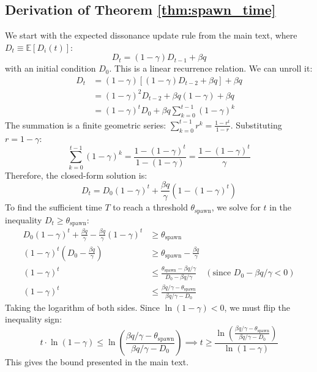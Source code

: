 \documentclass{article}
\begin{document}
\newpage
\begin{appendices}

\section{Derivation of Theorem \ref{thm:spawn_time}}
We start with the expected dissonance update rule from the main text, where $D_t \equiv \mathbb{E}[D_i(t)]$:
\begin{equation}
D_t = (1-\gamma)D_{t-1} + \beta q
\end{equation}
with an initial condition $D_0$. This is a linear recurrence relation. We can unroll it:
\begin{align*}
D_t &= (1-\gamma) \left[ (1-\gamma)D_{t-2} + \beta q \right] + \beta q \\
    &= (1-\gamma)^2 D_{t-2} + \beta q (1-\gamma) + \beta q \\
    &= (1-\gamma)^t D_0 + \beta q \sum_{k=0}^{t-1} (1-\gamma)^k
\end{align*}
The summation is a finite geometric series: $\sum_{k=0}^{t-1} r^k = \frac{1-r^t}{1-r}$. Substituting $r = 1-\gamma$:
\begin{equation}
\sum_{k=0}^{t-1} (1-\gamma)^k = \frac{1 - (1-\gamma)^t}{1 - (1-\gamma)} = \frac{1 - (1-\gamma)^t}{\gamma}
\end{equation}
Therefore, the closed-form solution is:
\begin{equation}
D_t = D_0(1-\gamma)^t + \frac{\beta q}{\gamma} \left(1-(1-\gamma)^t\right)
\end{equation}
To find the sufficient time $T$ to reach a threshold $\theta_{\text{spawn}}$, we solve for $t$ in the inequality $D_t \ge \theta_{\text{spawn}}$:
\begin{align*}
D_0(1-\gamma)^t + \frac{\beta q}{\gamma} - \frac{\beta q}{\gamma}(1-\gamma)^t &\ge \theta_{\text{spawn}} \\
(1-\gamma)^t \left(D_0 - \frac{\beta q}{\gamma}\right) &\ge \theta_{\text{spawn}} - \frac{\beta q}{\gamma} \\
(1-\gamma)^t &\le \frac{\theta_{\text{spawn}} - \beta q/\gamma}{D_0 - \beta q/\gamma} \quad (\text{since } D_0 - \beta q/\gamma < 0) \\
(1-\gamma)^t &\le \frac{\beta q/\gamma - \theta_{\text{spawn}}}{\beta q/\gamma - D_0}
\end{align*}
Taking the logarithm of both sides. Since $\ln(1-\gamma) < 0$, we must flip the inequality sign:
\begin{equation*}
t \cdot \ln(1-\gamma) \le \ln\left(\frac{\beta q/\gamma - \theta_{\text{spawn}}}{\beta q/\gamma - D_0}\right) \implies t \ge \frac{\ln\left(\frac{\beta q/\gamma - \theta_{\text{spawn}}}{\beta q/\gamma - D_0}\right)}{\ln(1-\gamma)}
\end{equation*}
This gives the bound presented in the main text.

\end{appendices}
\end{document}
